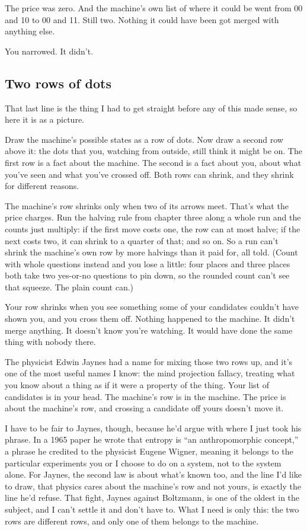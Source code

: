 \documentclass[11pt,twoside]{article}
\theoremstyle{thielethm}
\theoremstyle{thieledef}
\theoremstyle{thieledef}
\theoremstyle{thieledef}
\theoremstyle{thielethm}
\theoremstyle{thieleobs}
\theoremstyle{thielethm}
\begin{document}
The price was zero. And the machine's own list of where it could be went from 00 and 10 to 00 and 11. Still two. Nothing it could have been got merged with anything else.

You narrowed. It didn't.

\subsection{Two rows of dots}

That last line is the thing I had to get straight before any of this made sense, so here it is as a picture.

Draw the machine's possible states as a row of dots. Now draw a second row above it: the dots that you, watching from outside, still think it might be on. The first row is a fact about the machine. The second is a fact about you, about what you've seen and what you've crossed off. Both rows can shrink, and they shrink for different reasons.

The machine's row shrinks only when two of its arrows meet. That's what the price charges. Run the halving rule from chapter three along a whole run and the counts just multiply: if the first move costs one, the row can at most halve; if the next costs two, it can shrink to a quarter of that; and so on. So a run can't shrink the machine's own row by more halvings than it paid for, all told. (Count with whole questions instead and you lose a little: four places and three places both take two yes-or-no questions to pin down, so the rounded count can't see that squeeze. The plain count can.)

Your row shrinks when you see something some of your candidates couldn't have shown you, and you cross them off. Nothing happened to the machine. It didn't merge anything. It doesn't know you're watching. It would have done the same thing with nobody there.

The physicist Edwin Jaynes had a name for mixing those two rows up, and it's one of the most useful names I know: the mind projection fallacy, treating what you know about a thing as if it were a property of the thing. Your list of candidates is in your head. The machine's row is in the machine. The price is about the machine's row, and crossing a candidate off yours doesn't move it.

I have to be fair to Jaynes, though, because he'd argue with where I just took his phrase. In a 1965 paper he wrote that entropy is ``an anthropomorphic concept,'' a phrase he credited to the physicist Eugene Wigner, meaning it belongs to the particular experiments you or I choose to do on a system, not to the system alone. For Jaynes, the second law is about what's known too, and the line I'd like to draw, that physics cares about the machine's row and not yours, is exactly the line he'd refuse. That fight, Jaynes against Boltzmann, is one of the oldest in the subject, and I can't settle it and don't have to. What I need is only this: the two rows are different rows, and only one of them belongs to the machine.
\end{document}
